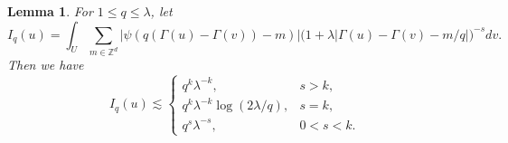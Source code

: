 \documentclass[11pt,reqno]{amsart}
\newtheorem{lemma}[theorem]{Lemma}
\numberwithin{equation}{section}
\newcommand{\1}{\textbf{1}}
\newcommand{\ls}{\lesssim}
\newcommand{\R}{\mathbb R}
\newcommand{\Z}{\mathbb Z}
\newcommand{\la}{\lambda}
\newcommand{\dd}{\,d}
\begin{document}
	
	
	
	
	\begin{lemma}\label{lem:packing}
		For \(1\le q\le\la\), let
		\[
		I_q(u)=\int_{U}
		\sum_{m\in\Z^d}
		|\psi(q(\Gamma(u)-\Gamma(v))-m)|
		\bigl(1+\la|\Gamma(u)-\Gamma(v)-m/q|\bigr)^{-s}d v.
		\]
		Then we have
		\begin{equation}
			I_q(u)
			\ls
			\begin{cases}
				q^k\la^{-k},&s>k,\\
				q^k\la^{-k}\log(2\la/q),&s=k,\\
				q^s\la^{-s},&0<s<k.
			\end{cases}
		\end{equation}
	\end{lemma}
	
\end{document}
